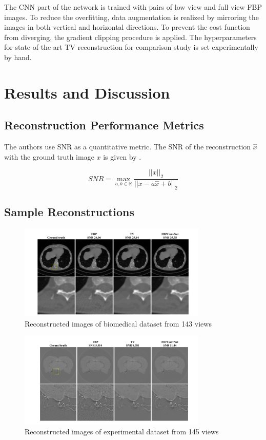 \documentclass[journal, onecolumn, 11pt]{IEEEtran}
\begin{document}
The CNN part of the network is trained with pairs of low view and full view FBP images. To reduce the overfitting, data augmentation is realized by mirroring the images in both vertical and horizontal directions. To prevent the cost function from diverging, the gradient clipping procedure is applied. The hyperparameters for state-of-the-art TV reconstruction \cite{TV} for comparison study is set experimentally by hand. 

\section{Results and Discussion}

\subsection{Reconstruction Performance Metrics}
The authors use SNR as a quantitative metric. The SNR of the reconstruction $\hat{x}$ with the ground truth image $x$ is given by .

\begin{equation}
    SNR = \operatorname*{max}_{a,b \in \mathbb{R}} \frac{||x||_2}{||x - a\hat{x} + b||_2}
    \label{eqn:SNR}
\end{equation}

\subsection{Sample Reconstructions}

\begin{figure}[h]
\centering
\includegraphics[width=0.8\textwidth]{images/results1.png}
\caption{Reconstructed images of biomedical dataset from 143 views}\label{fig:res1}
\end{figure}

\begin{figure}[h]
    \centering
    \includegraphics[width=0.8\textwidth]{images/results2.png}
    \caption{Reconstructed images of experimental dataset from 145 views}\label{fig:res2}
\end{figure}
\end{document}
